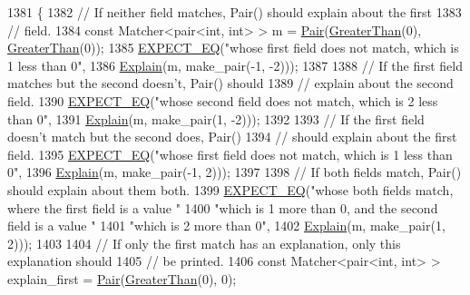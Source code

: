 \begin{DoxyCode}
1381                                         \{
1382   \textcolor{comment}{// If neither field matches, Pair() should explain about the first}
1383   \textcolor{comment}{// field.}
1384   \textcolor{keyword}{const} Matcher<pair<int, int> > m = \hyperlink{namespacetesting_ac7520de8af26d3085513eeeb68561889}{Pair}(\hyperlink{namespacetesting_1_1gmock__matchers__test_a8cf8614a7c9adc8fb00e8af04895f97c}{GreaterThan}(0), 
      \hyperlink{namespacetesting_1_1gmock__matchers__test_a8cf8614a7c9adc8fb00e8af04895f97c}{GreaterThan}(0));
1385   \hyperlink{gtest_8h_a4159019abda84f5366acdb7604ff220a}{EXPECT\_EQ}(\textcolor{stringliteral}{"whose first field does not match, which is 1 less than 0"},
1386             \hyperlink{namespacetesting_1_1gmock__matchers__test_a6215aeb6213a03f4233924ef1c74d968}{Explain}(m, make\_pair(-1, -2)));
1387 
1388   \textcolor{comment}{// If the first field matches but the second doesn't, Pair() should}
1389   \textcolor{comment}{// explain about the second field.}
1390   \hyperlink{gtest_8h_a4159019abda84f5366acdb7604ff220a}{EXPECT\_EQ}(\textcolor{stringliteral}{"whose second field does not match, which is 2 less than 0"},
1391             \hyperlink{namespacetesting_1_1gmock__matchers__test_a6215aeb6213a03f4233924ef1c74d968}{Explain}(m, make\_pair(1, -2)));
1392 
1393   \textcolor{comment}{// If the first field doesn't match but the second does, Pair()}
1394   \textcolor{comment}{// should explain about the first field.}
1395   \hyperlink{gtest_8h_a4159019abda84f5366acdb7604ff220a}{EXPECT\_EQ}(\textcolor{stringliteral}{"whose first field does not match, which is 1 less than 0"},
1396             \hyperlink{namespacetesting_1_1gmock__matchers__test_a6215aeb6213a03f4233924ef1c74d968}{Explain}(m, make\_pair(-1, 2)));
1397 
1398   \textcolor{comment}{// If both fields match, Pair() should explain about them both.}
1399   \hyperlink{gtest_8h_a4159019abda84f5366acdb7604ff220a}{EXPECT\_EQ}(\textcolor{stringliteral}{"whose both fields match, where the first field is a value "}
1400             \textcolor{stringliteral}{"which is 1 more than 0, and the second field is a value "}
1401             \textcolor{stringliteral}{"which is 2 more than 0"},
1402             \hyperlink{namespacetesting_1_1gmock__matchers__test_a6215aeb6213a03f4233924ef1c74d968}{Explain}(m, make\_pair(1, 2)));
1403 
1404   \textcolor{comment}{// If only the first match has an explanation, only this explanation should}
1405   \textcolor{comment}{// be printed.}
1406   \textcolor{keyword}{const} Matcher<pair<int, int> > explain\_first = \hyperlink{namespacetesting_ac7520de8af26d3085513eeeb68561889}{Pair}(\hyperlink{namespacetesting_1_1gmock__matchers__test_a8cf8614a7c9adc8fb00e8af04895f97c}{GreaterThan}(0), 0);

\end{DoxyCode}
